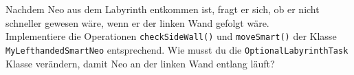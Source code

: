 
	Nachdem Neo aus dem Labyrinth entkommen ist, fragt er sich, ob er nicht schneller gewesen wäre, wenn er der linken Wand gefolgt wäre.\\

	
		 Implementiere die Operationen \lstinline{checkSideWall()} und \lstinline{moveSmart()} der Klasse \lstinline{MyLefthandedSmartNeo} entsprechend.
		 Wie musst du die \lstinline{OptionalLabyrinthTask} Klasse verändern, damit Neo an der linken Wand entlang läuft?\\
	


